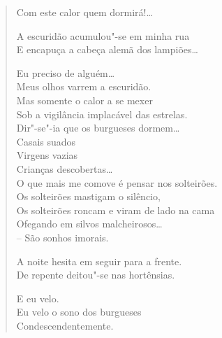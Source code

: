\begin{verse}
Com este calor quem dormirá!\ldots{}

A escuridão acumulou"-se em minha rua\\
E encapuça a cabeça alemã dos lampiões\ldots{}

Eu preciso de alguém\ldots{}\\
Meus olhos varrem a escuridão.\\
Mas somente o calor a se mexer\\
Sob a vigilância implacável das estrelas.\\
Dir"-se"-ia que os burgueses dormem\ldots{}\\
\qquad\qquad Casais suados\\
\qquad\qquad Virgens vazias\\
\qquad\qquad Crianças descobertas\ldots{}\\
O que mais me comove é pensar nos solteirões.\\
Os solteirões mastigam o silêncio,\\
Os solteirões roncam e viram de lado na cama\\
Ofegando em silvos malcheirosos\ldots{}\\
\qquad\qquad\quad -- São sonhos imorais.

A noite hesita em seguir para a frente.\\
De repente deitou"-se nas hortênsias.

E eu velo.\\
Eu velo o sono dos burgueses\\
Condescendentemente.
\end{verse}



